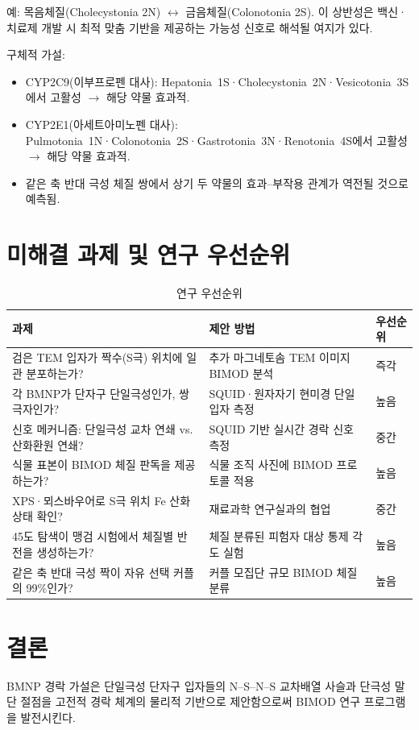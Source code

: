 \documentclass[12pt,a4paper]{article}
\begin{document}
예: 목음체질(Cholecystonia 2N) $\leftrightarrow$ 금음체질(Colonotonia 2S).
이 상반성은 백신·치료제 개발 시 최적 맞춤 기반을 제공하는 가능성 신호로
해석될 여지가 있다.

구체적 가설:
\begin{itemize}
  \item CYP2C9(이부프로펜 대사): Hepatonia~1S·Cholecystonia~2N·Vesicotonia~3S에서
        고활성 $\to$ 해당 약물 효과적.
  \item CYP2E1(아세트아미노펜 대사): Pulmotonia~1N·Colonotonia~2S·Gastrotonia~3N·Renotonia~4S에서
        고활성 $\to$ 해당 약물 효과적.
  \item 같은 축 반대 극성 체질 쌍에서 상기 두 약물의 효과--부작용 관계가
        역전될 것으로 예측됨.
\end{itemize}

\section{미해결 과제 및 연구 우선순위}

\begin{table}[h]
\centering
\caption{연구 우선순위}
\begin{tabular}{p{4.5cm} p{5cm} l}
\toprule
과제 & 제안 방법 & 우선순위 \\
\midrule
검은 TEM 입자가 짝수(S극) 위치에 일관 분포하는가? &
  추가 마그네토솜 TEM 이미지 BIMOD 분석 & 즉각 \\
각 BMNP가 단자구 단일극성인가, 쌍극자인가? &
  SQUID·원자자기 현미경 단일 입자 측정 & 높음 \\
신호 메커니즘: 단일극성 교차 연쇄 vs. 산화환원 연쇄? &
  SQUID 기반 실시간 경락 신호 측정 & 중간 \\
식물 표본이 BIMOD 체질 판독을 제공하는가? &
  식물 조직 사진에 BIMOD 프로토콜 적용 & 높음 \\
XPS·뫼스바우어로 S극 위치 Fe 산화 상태 확인? &
  재료과학 연구실과의 협업 & 중간 \\
45도 탐색이 맹검 시험에서 체질별 반전을 생성하는가? &
  체질 분류된 피험자 대상 통제 각도 실험 & 높음 \\
같은 축 반대 극성 짝이 자유 선택 커플의 99\%인가? &
  커플 모집단 규모 BIMOD 체질 분류 & 높음 \\
\bottomrule
\end{tabular}
\end{table}

\section{결론}
BMNP 경락 가설은 단일극성 단자구 입자들의 N--S--N--S 교차배열 사슬과
단극성 말단 절점을 고전적 경락 체계의 물리적 기반으로 제안함으로써
BIMOD 연구 프로그램을 발전시킨다.
\end{document}
